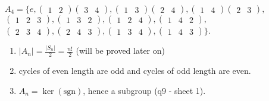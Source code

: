 \begin{example}
\(A_4 = \{ e, \begin{pmatrix}1 & 2\end{pmatrix} \begin{pmatrix}3 & 4\end{pmatrix}, \begin{pmatrix}1 & 3\end{pmatrix} \begin{pmatrix}2 & 4\end{pmatrix}, \begin{pmatrix}1 & 4\end{pmatrix} \begin{pmatrix}2 & 3\end{pmatrix},\) \(\begin{pmatrix}1 & 2 & 3\end{pmatrix}, \begin{pmatrix}1 & 3 & 2\end{pmatrix}, \begin{pmatrix}1 & 2 & 4\end{pmatrix}, \begin{pmatrix}1 & 4 & 2\end{pmatrix},\) \(\begin{pmatrix}2 & 3 & 4\end{pmatrix}, \begin{pmatrix}2 & 4 & 3\end{pmatrix}, \begin{pmatrix}1 & 3 & 4\end{pmatrix}, \begin{pmatrix}1 & 4 & 3\end{pmatrix} \}\).
\end{example}

\begin{remark} \mbox{}
  \begin{enumerate}
  \def\labelenumi{\roman{enumi}.}
  \item
    \(|A_n| = \frac{|S_n|}{2} = \frac{n!}{2}\) (will be proved later on)
  \item
    cycles of even length are odd and cycles of odd length are even.
  \item
    \(A_n = \ker (\text{sgn})\), hence a subgroup (q9 - sheet 1).
  \end{enumerate}
\end{remark}